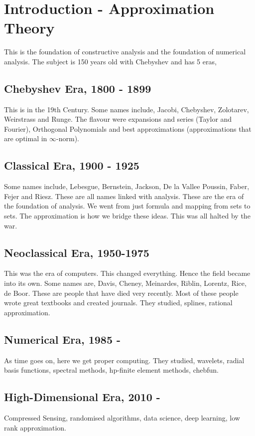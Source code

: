 
\section{Introduction - Approximation Theory}
This is the foundation of constructive analysis and the foundation of numerical analysis. The subject is 150 years old with Chebyshev and has 5 eras,
\subsection*{Chebyshev Era, 1800 - 1899}
This is in the 19th Century. Some names include, Jacobi, Chebyshev, Zolotarev, Weirstrass and Runge. The flavour were expansions and series (Taylor and Fourier), Orthogonal Polynomials and best approximations (approximations that are optimal in $\infty$-norm).

\subsection*{Classical Era, 1900 - 1925}
Some names include, Lebesgue, Bernstein, Jackson, De la Vallee Poussin, Faber, Fejer and Riesz. These are all names linked with analysis. These are the era of the foundation of analysis. We went from just formula and mapping from sets to sets. The approximation is how we bridge these ideas. This was all halted by the war.

\subsection*{Neoclassical Era, 1950-1975}
This was the era of computers. This changed everything. Hence the field became into its own. Some names are, Davis, Cheney, Meinardes, Riblin, Lorentz, Rice, de Boor. These are people that have died very recently. Most of these people wrote great textbooks and created journals. They studied, splines, rational approximation.

\subsection*{Numerical Era, 1985 -}
As time goes on, here we get proper computing. They studied, wavelets, radial basis functions, spectral methods, hp-finite element methods, chebfun.

\subsection*{High-Dimensional Era, 2010 - }
Compressed Sensing, randomised algorithms, data science, deep learning, low rank approximation.

